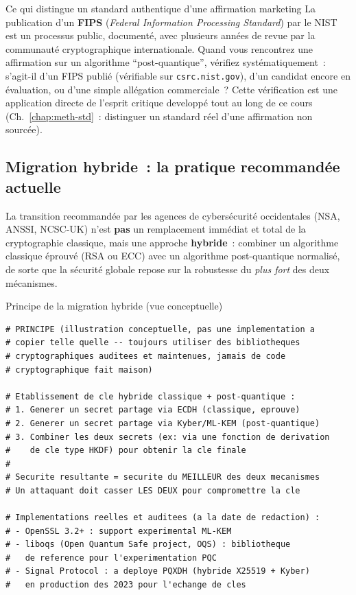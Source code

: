 \begin{boiteRemarque}{Ce qui distingue un standard authentique d'une
affirmation marketing}
La publication d'un \textbf{FIPS} (\textit{Federal Information
Processing Standard}) par le NIST est un processus public,
documenté, avec plusieurs années de revue par la communauté
cryptographique internationale. Quand vous rencontrez une
affirmation sur un algorithme ``post-quantique'', vérifiez
systématiquement~: s'agit-il d'un FIPS publié (vérifiable sur
\texttt{csrc.nist.gov}), d'un candidat encore en évaluation, ou
d'une simple allégation commerciale~? Cette vérification est
une application directe de l'esprit critique developpé tout au
long de ce cours (Ch.~\ref{chap:meth-std}~: distinguer un standard
réel d'une affirmation non sourcée).
\end{boiteRemarque}

\subsection{Migration hybride~: la pratique recommandée actuelle}

La transition recommandée par les agences de cybersécurité
occidentales (NSA, ANSSI, NCSC-UK) n'est \textbf{pas} un
remplacement immédiat et total de la cryptographie classique,
mais une approche \textbf{hybride}~: combiner un algorithme
classique éprouvé (RSA ou ECC) avec un algorithme post-quantique
normalisé, de sorte que la sécurité globale repose sur la
robustesse du \emph{plus fort} des deux mécanismes.

\begin{boxoutils}{Principe de la migration hybride (vue conceptuelle)}
\begin{lstlisting}[language=bash_forensique]
# PRINCIPE (illustration conceptuelle, pas une implementation a
# copier telle quelle -- toujours utiliser des bibliotheques
# cryptographiques auditees et maintenues, jamais de code
# cryptographique fait maison)

# Etablissement de cle hybride classique + post-quantique :
# 1. Generer un secret partage via ECDH (classique, eprouve)
# 2. Generer un secret partage via Kyber/ML-KEM (post-quantique)
# 3. Combiner les deux secrets (ex: via une fonction de derivation
#    de cle type HKDF) pour obtenir la cle finale
#
# Securite resultante = securite du MEILLEUR des deux mecanismes
# Un attaquant doit casser LES DEUX pour compromettre la cle

# Implementations reelles et auditees (a la date de redaction) :
# - OpenSSL 3.2+ : support experimental ML-KEM
# - liboqs (Open Quantum Safe project, OQS) : bibliotheque
#   de reference pour l'experimentation PQC
# - Signal Protocol : a deploye PQXDH (hybride X25519 + Kyber)
#   en production des 2023 pour l'echange de cles
\end{lstlisting}
\end{boxoutils}

